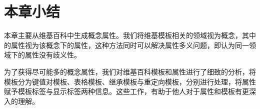 %
%
\section{本章小结}

本章主要从维基百科中生成概念属性。我们将维基模板相关的领域视为概念，其中的属性视为该概念下的属性，这种方法同时可以解决属性多义问题，即认为同一领域下的属性没有歧义性。

为了获得尽可能多的概念属性，我们对维基百科模板和属性进行了细致的分析，将模板分为键值对模板、表格模板、继承模板与重定向模板，分别进行处理，将属性赋予模板标签与显示标签两种信息。这些工作，有助于他人对于属性和模板有更深入的理解。


